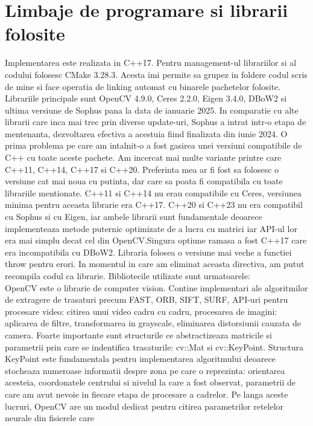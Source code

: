 \documentclass[12pt,a4paper]{report}
\begin{document}
\section{Limbaje de programare si librarii folosite}
Implementarea este realizata in C++17. Pentru management-ul librariilor si al codului folosesc
CMake 3.28.3. Acesta imi permite sa grupez in foldere codul scris de mine si face operatia de 
linking automat cu binarele pachetelor folosite. Librariile principale sunt OpenCV 4.9.0, Ceres 2.2.0, Eigen 3.4.0, DBoW2 si ultima versiune de Sophus
pana la data de ianuarie 2025. In comparatie cu alte librarii care inca mai trec 
prin diverse update-uri, Sophus a intrat intr-o etapa de mentenanta, dezvoltarea efectiva a 
acestuia fiind finalizata din iunie 2024. O prima problema pe care am intalnit-o a fost gasirea 
unei versiuni compatibile de C++ cu toate aceste pachete. Am incercat mai multe variante printre 
care C++11, C++14, C++17 si C++20. Preferinta mea ar fi fost sa folosesc o versiune cat mai noua
cu putinta, dar care sa poata fi compatibila cu toate librariile mentionate. C++11 si C++14 nu 
erau compatibile cu Ceres, versiunea minima pentru aceasta librarie era C++17. C++20  si C++23 nu 
era compatibil cu Sophus si cu Eigen, iar ambele librarii sunt fundamentale deoarece 
implementeaza metode puternic optimizate de a lucra cu matrici iar API-ul lor era mai simplu decat
cel din OpenCV.\@ Singura optiune ramasa a fost C++17 care era incompatibila cu DBoW2. Libraria 
folosea o versiune mai veche a functiei throw pentru erori. In momentul in care am eliminat aceasta
directiva, am putut recompila codul ca librarie. Bibliotecile utilizate sunt urmatoarele: \\
OpenCV este o librarie de computer vision. Contine implementari ale algoritmilor de extragere de
trasaturi precum FAST, ORB, SIFT, SURF, API-uri pentru procesare video: citirea unui video cadru
cu cadru, procesarea de imagini: aplicarea de filtre, transformarea in grayscale, eliminarea distorsiunii
cauzata de camera. Foarte importante sunt structurile ce abstractizeaza matricile si parametrii 
prin care se indentifica trasaturile: cv::Mat si cv::KeyPoint. Structura KeyPoint este 
fundamentala pentru implementarea algoritmului deoarece stocheaza numeroase informatii despre zona
pe care o reprezinta: orientarea acesteia, coordonatele centrului si nivelul la care a fost observat, 
parametrii de care am avut nevoie in fiecare etapa de procesare a cadrelor. Pe langa aceste 
lucruri, OpenCV are un modul dedicat pentru citirea parametrilor retelelor neurale din fisierele care 
\end{document}
